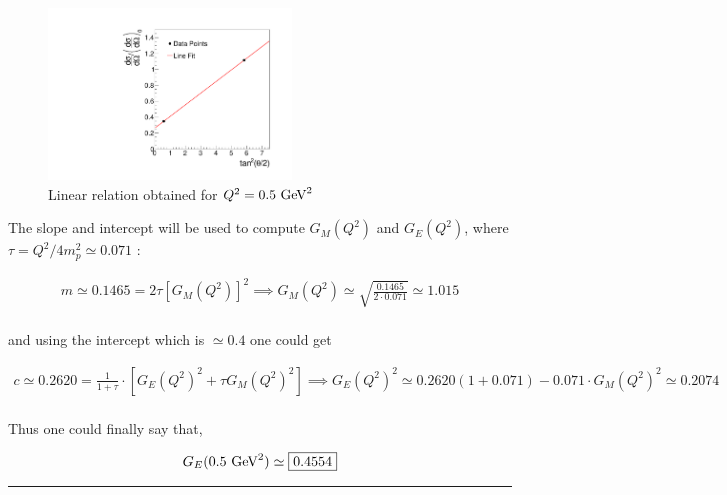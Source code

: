 \begin{solution}
\begin{figure}[htbp!] %
    \centering
    \includegraphics[width=0.575\textwidth]{Figures/Ch7/P7.7.pdf}
    \caption{Linear relation obtained for $Q^2=0.5\text{ GeV}^2$}
    \label{fig:P7.7}  
\end{figure}
  
The slope and intercept will be used to compute $G_M(Q^2)$ and $G_E(Q^2)$, where $\tau=Q^2/4m_p^2 \simeq 0.071$ :

\begin{align*}
    m \simeq 0.1465 = 2\tau \left[G_M(Q^2)\right]^2 \implies G_M(Q^2) \simeq \sqrt{\frac{0.1465}{2\cdot 0.071}}\simeq 1.015
\end{align*}\\

and using the intercept which is $\simeq 0.4$ one could get

\begin{align*}
    c \simeq 0.2620 = \frac{1}{1+\tau}\cdot \left[ G_E(Q^2)^2 + \tau G_M(Q^2)^2 \right] \implies G_E(Q^2)^2 \simeq  0.2620(1+0.071)-0.071 \cdot G_M(Q^2)^2 \simeq 0.2074
\end{align*}\\
Thus one could finally say that,

\begin{align*}
    G_E(0.5\text{ GeV}^2) \simeq \boxed{0.4554}
\end{align*}
\end{solution}

\noindent\rule{7in}{1.5pt}
 


